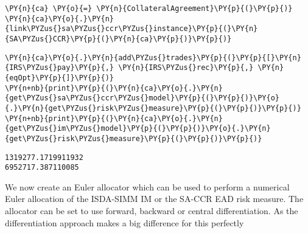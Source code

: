 \begin{tcolorbox}[breakable, size=fbox, boxrule=1pt, pad at break*=1mm,colback=cellbackground, colframe=cellborder]
\begin{Verbatim}[commandchars=\\\{\}]
\PY{n}{ca} \PY{o}{=} \PY{n}{CollateralAgreement}\PY{p}{(}\PY{p}{)}
\PY{n}{ca}\PY{o}{.}\PY{n}{link\PYZus{}sa\PYZus{}ccr\PYZus{}instance}\PY{p}{(}\PY{n}{SA\PYZus{}CCR}\PY{p}{(}\PY{n}{ca}\PY{p}{)}\PY{p}{)}
\end{Verbatim}
\end{tcolorbox}

    \begin{tcolorbox}[breakable, size=fbox, boxrule=1pt, pad at break*=1mm,colback=cellbackground, colframe=cellborder]
\begin{Verbatim}[commandchars=\\\{\}]
\PY{n}{ca}\PY{o}{.}\PY{n}{add\PYZus{}trades}\PY{p}{(}\PY{p}{[}\PY{n}{IRS\PYZus{}pay}\PY{p}{,} \PY{n}{IRS\PYZus{}rec}\PY{p}{,} \PY{n}{eqOpt}\PY{p}{]}\PY{p}{)}
\PY{n+nb}{print}\PY{p}{(}\PY{n}{ca}\PY{o}{.}\PY{n}{get\PYZus{}sa\PYZus{}ccr\PYZus{}model}\PY{p}{(}\PY{p}{)}\PY{o}{.}\PY{n}{get\PYZus{}risk\PYZus{}measure}\PY{p}{(}\PY{p}{)}\PY{p}{)}
\PY{n+nb}{print}\PY{p}{(}\PY{n}{ca}\PY{o}{.}\PY{n}{get\PYZus{}im\PYZus{}model}\PY{p}{(}\PY{p}{)}\PY{o}{.}\PY{n}{get\PYZus{}risk\PYZus{}measure}\PY{p}{(}\PY{p}{)}\PY{p}{)}
\end{Verbatim}
\end{tcolorbox}

    \begin{Verbatim}[commandchars=\\\{\}]
1319277.1719911932
6952717.387110085
    \end{Verbatim}

    We now create an Euler allocator which can be used to perform a
numerical Euler allocation of the ISDA-SIMM IM or the SA-CCR EAD risk
measure. The allocator can be set to use forward, backward or central
differentiation. As the differentiation approach makes a big difference
for this perfectly

